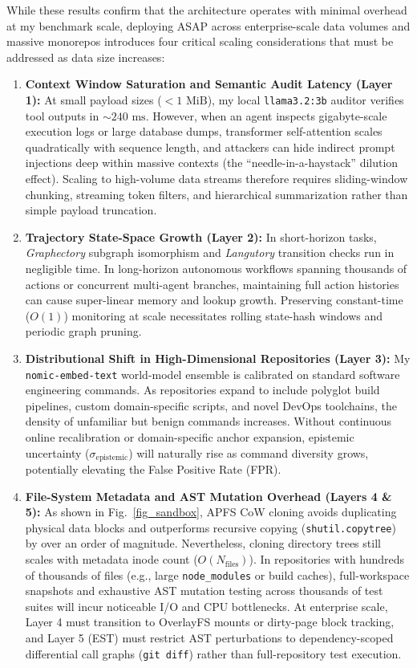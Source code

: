 \documentclass[conference]{IEEEtran}
\begin{document}
While these results confirm that the architecture operates with minimal overhead at my benchmark scale, deploying ASAP across enterprise-scale data volumes and massive monorepos introduces four critical scaling considerations that must be addressed as data size increases:
\begin{enumerate}
    \item \textbf{Context Window Saturation and Semantic Audit Latency (Layer 1):} At small payload sizes ($< 1\text{ MiB}$), my local \texttt{llama3.2:3b} auditor verifies tool outputs in $\sim 240\text{ ms}$. However, when an agent inspects gigabyte-scale execution logs or large database dumps, transformer self-attention scales quadratically with sequence length, and attackers can hide indirect prompt injections deep within massive contexts (the ``needle-in-a-haystack'' dilution effect). Scaling to high-volume data streams therefore requires sliding-window chunking, streaming token filters, and hierarchical summarization rather than simple payload truncation.
    \item \textbf{Trajectory State-Space Growth (Layer 2):} In short-horizon tasks, \textit{Graphectory} subgraph isomorphism and \textit{Langutory} transition checks run in negligible time. In long-horizon autonomous workflows spanning thousands of actions or concurrent multi-agent branches, maintaining full action histories can cause super-linear memory and lookup growth. Preserving constant-time ($O(1)$) monitoring at scale necessitates rolling state-hash windows and periodic graph pruning.
    \item \textbf{Distributional Shift in High-Dimensional Repositories (Layer 3):} My \texttt{nomic-embed-text} world-model ensemble is calibrated on standard software engineering commands. As repositories expand to include polyglot build pipelines, custom domain-specific scripts, and novel DevOps toolchains, the density of unfamiliar but benign commands increases. Without continuous online recalibration or domain-specific anchor expansion, epistemic uncertainty ($\sigma_{\text{epistemic}}$) will naturally rise as command diversity grows, potentially elevating the False Positive Rate (FPR).
    \item \textbf{File-System Metadata and AST Mutation Overhead (Layers 4 \& 5):} As shown in Fig.~\ref{fig_sandbox}, APFS CoW cloning avoids duplicating physical data blocks and outperforms recursive copying (\texttt{shutil.copytree}) by over an order of magnitude. Nevertheless, cloning directory trees still scales with metadata inode count ($O(N_{\text{files}})$). In repositories with hundreds of thousands of files (e.g., large \texttt{node\_modules} or build caches), full-workspace snapshots and exhaustive AST mutation testing across thousands of test suites will incur noticeable I/O and CPU bottlenecks. At enterprise scale, Layer 4 must transition to OverlayFS mounts or dirty-page block tracking, and Layer 5 (EST) must restrict AST perturbations to dependency-scoped differential call graphs (\texttt{git diff}) rather than full-repository test execution.
\end{enumerate}
\end{document}
